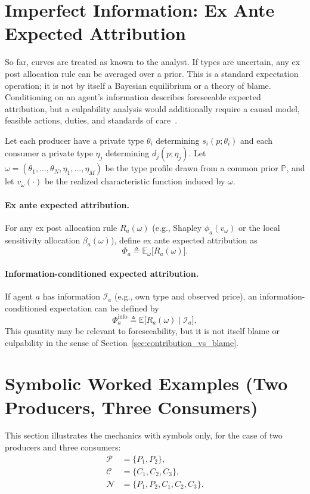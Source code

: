 \documentclass[journal, a4paper]{IEEEtran}
\begin{document}
\section{Imperfect Information: Ex Ante Expected Attribution}
\label{sec:exante}
So far, curves are treated as known to the analyst. If types are uncertain, any ex post allocation rule can be averaged over a prior. This is a standard expectation operation; it is not by itself a Bayesian equilibrium or a theory of blame. Conditioning on an agent's information describes foreseeable expected attribution, but a culpability analysis would additionally require a causal model, feasible actions, duties, and standards of care~\cite{ChocklerHalpern2004}.

Let each producer have a private type $\theta_i$ determining $s_i(p;\theta_i)$ and each consumer a private type $\eta_j$ determining $d_j(p;\eta_j)$. Let $\omega=(\theta_1,\dots,\theta_N,\eta_1,\dots,\eta_M)$ be the type profile drawn from a common prior $\mathbb{P}$, and let $v_\omega(\cdot)$ be the realized characteristic function induced by $\omega$.

\paragraph{Ex ante expected attribution.}
For any ex post allocation rule $R_a(\omega)$ (e.g., Shapley $\phi_a(v_\omega)$ or the local sensitivity allocation $\beta_a(\omega)$), define ex ante expected attribution as
\begin{equation}
\Phi_a \triangleq \mathbb{E}_\omega\big[R_a(\omega)\big].
\end{equation}

\paragraph{Information-conditioned expected attribution.}
If agent $a$ has information $\mathcal{I}_a$ (e.g., own type and observed price), an information-conditioned expectation can be defined by
\begin{equation}
\Phi_a^{\text{info}} \triangleq \mathbb{E}\big[R_a(\omega)\mid \mathcal{I}_a\big],
\end{equation}
This quantity may be relevant to foreseeability, but it is not itself blame or culpability in the sense of Section~\ref{sec:contribution_vs_blame}.

\section{Symbolic Worked Examples (Two Producers, Three Consumers)}
This section illustrates the mechanics with symbols only, for the case of two producers and three consumers:
\begin{align}
\mathcal{P}&=\{P_1,P_2\},\\
\mathcal{C}&=\{C_1,C_2,C_3\},\\
\mathcal{N}&=\{P_1,P_2,C_1,C_2,C_3\}.
\end{align}
\end{document}
